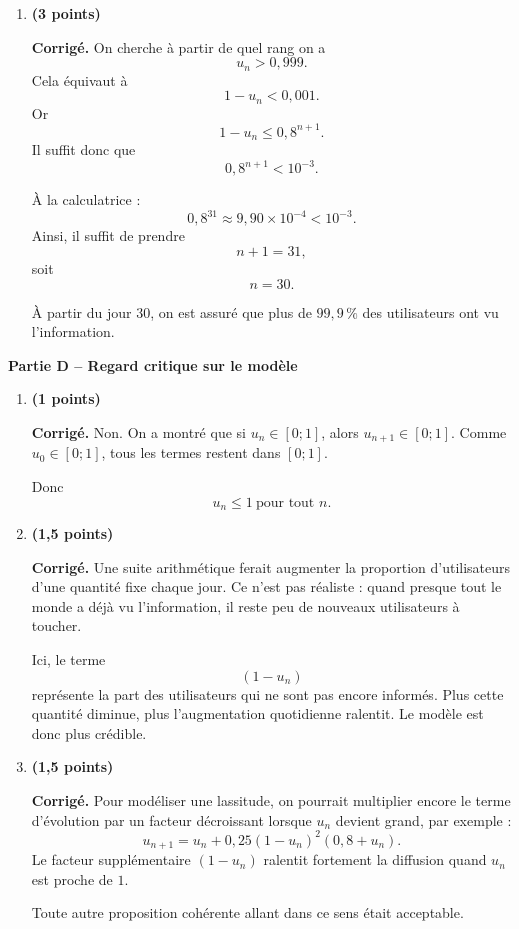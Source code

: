 \documentclass[11pt,a4paper]{article}
\newcommand{\bareme}[1]{\hfill{\color{blue!70!black}\textbf{(#1 points)}}}
\newcommand{\corr}{\noindent\textcolor{blue!70!black}{\textbf{Corrigé. }}}
\begin{document}
\begin{enumerate}[label=\textbf{C.\arabic*.}, leftmargin=0.9cm]
Autrement dit, \textbf{la proportion d’utilisateurs n’ayant pas encore vu l’information décroît au moins aussi vite qu’une suite géométrique de raison $0{,}8$}. La diffusion se rapproche donc progressivement de $100\,\%$.

\item \bareme{3}

\corr On cherche à partir de quel rang on a
\[
u_n>0{,}999.
\]
Cela équivaut à
\[
1-u_n<0{,}001.
\]
Or
\[
1-u_n\leq 0{,}8^{n+1}.
\]
Il suffit donc que
\[
0{,}8^{n+1}<10^{-3}.
\]

À la calculatrice :
\[
0{,}8^{31}\approx 9{,}90\times 10^{-4}<10^{-3}.
\]
Ainsi, il suffit de prendre
\[
n+1=31,
\]
soit
\[
\boxed{n=30.}
\]

À partir du jour $30$, on est assuré que plus de $99{,}9\,\%$ des utilisateurs ont vu l’information.

\end{enumerate}

\medskip

\textbf{Partie D -- Regard critique sur le modèle}

\begin{enumerate}[label=\textbf{D.\arabic*.}, leftmargin=0.9cm]

\item \bareme{1}

\corr Non. On a montré que si $u_n\in[0;1]$, alors $u_{n+1}\in[0;1]$. Comme $u_0\in[0;1]$, tous les termes restent dans $[0;1]$.

Donc
\[
\boxed{u_n\leq 1\ \text{pour tout }n.}
\]

\item \bareme{1,5}

\corr Une suite arithmétique ferait augmenter la proportion d’utilisateurs d’une quantité fixe chaque jour. Ce n’est pas réaliste : quand presque tout le monde a déjà vu l’information, il reste peu de nouveaux utilisateurs à toucher.

Ici, le terme
\[
(1-u_n)
\]
représente la part des utilisateurs qui ne sont pas encore informés. Plus cette quantité diminue, plus l’augmentation quotidienne ralentit. Le modèle est donc plus crédible.

\item \bareme{1,5}

\corr Pour modéliser une lassitude, on pourrait multiplier encore le terme d’évolution par un facteur décroissant lorsque $u_n$ devient grand, par exemple :
\[
u_{n+1}=u_n+0{,}25(1-u_n)^2(0{,}8+u_n).
\]
Le facteur supplémentaire $(1-u_n)$ ralentit fortement la diffusion quand $u_n$ est proche de $1$.

Toute autre proposition cohérente allant dans ce sens était acceptable.

\end{enumerate}
\end{document}
